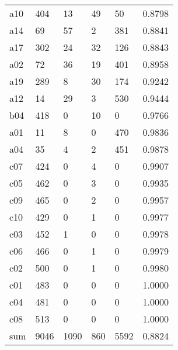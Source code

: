 \documentclass[prelim,showlabels]{book}
\begin{document}
\begin{table}
{\begin{tabular}{|llllll|}
      a10 &  404 &   13 &   49 &   50 & 0.8798 \\
      a14 &   69 &   57 &    2 &  381 & 0.8841 \\
      a17 &  302 &   24 &   32 &  126 & 0.8843 \\
      a02 &   72 &   36 &   19 &  401 & 0.8958 \\
      a19 &  289 &    8 &   30 &  174 & 0.9242 \\
      a12 &   14 &   29 &    3 &  530 & 0.9444 \\
      b04 &  418 &    0 &   10 &    0 & 0.9766 \\
      a01 &   11 &    8 &    0 &  470 & 0.9836 \\
      a04 &   35 &    4 &    2 &  451 & 0.9878 \\
      c07 &  424 &    0 &    4 &    0 & 0.9907 \\
      c05 &  462 &    0 &    3 &    0 & 0.9935 \\
      c09 &  465 &    0 &    2 &    0 & 0.9957 \\
      c10 &  429 &    0 &    1 &    0 & 0.9977 \\
      c03 &  452 &    1 &    0 &    0 & 0.9978 \\
      c06 &  466 &    0 &    1 &    0 & 0.9979 \\
      c02 &  500 &    0 &    1 &    0 & 0.9980 \\
      c01 &  483 &    0 &    0 &    0 & 1.0000 \\
      c04 &  481 &    0 &    0 &    0 & 1.0000 \\
      c08 &  513 &    0 &    0 &    0 & 1.0000 \\
      \hline
      \rule{0pt}{2.0ex}%
      sum & 9046 & 1090 &  860 & 5592 & 0.8824\\
      \hline
    \end{tabular}}
  \label{tab:result1}
\end{table}
\end{document}
